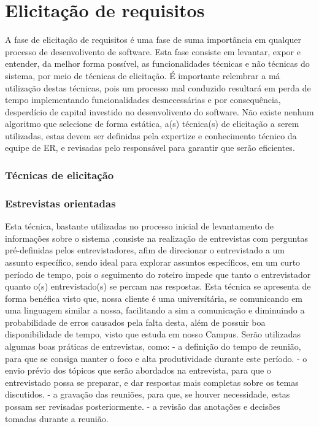 \chapter{Elicitação de requisitos}
A fase de elicitação de requisitos é uma fase de suma importância em qualquer processo de  desenvolivento de software. 
Esta fase consiste em levantar, expor e entender, da melhor forma possível, as funcionalidades técnicas e não técnicas do sistema,
por meio de técnicas de elicitação. É importante relembrar a má utilização destas técnicas, pois um processo mal conduzido 
resultará em perda de tempo implementando funcionalidades desnecessárias e por 
consequência, desperdício de capital investido no desenvolivento do software.
Não existe nenhum algoritmo que selecione de forma estática, a(s) técnica(s) de elicitação a serem utilizadas, 
estas devem ser definidas pela expertize e conhecimento técnico da equipe de ER, e revisadas pelo responsável para garantir
que serão eficientes.

  \subsection{Técnicas de elicitação}
  
  \subsection{Estrevistas orientadas}
  Esta técnica, bastante utilizadas no processo inicial de levantamento de informações sobre o sistema
  ,consiste na realização de entrevistas com perguntas pré-definidas pelos entrevistadores, afim de direcionar o 
  entrevistado a um assunto específico, sendo ideal para explorar assuntos específicos, em um curto período de tempo,
  pois o seguimento do roteiro impede que tanto o entrevistador quanto o(s) entrevistado(s) se percam nas respostas. Esta 
  técnica se apresenta de forma benéfica visto que, nossa cliente é uma universítária, se comunicando em uma linguagem 
  similar a nossa, facilitando a sim a comunicação e diminuindo a probabilidade de erros causados pela falta desta, além de
  possuir boa disponibilidade de tempo, visto que estuda em nosso Campus.
  Serão utilizadas algumas boas práticas de entrevistas, como: 
  - a definição do tempo de reunião, para que se consiga manter o foco
  e alta produtividade durante este período.
  - o envio prévio dos tópicos que serão abordados na entrevista, para que o entrevistado possa se preparar, e dar respostas mais
  completas sobre os temas discutidos.
  - a gravação das reuniões, para que, se houver necessidade, estas possam ser revisadas posteriormente.
  - a revisão das anotações e decisões tomadas durante a reunião.
  

